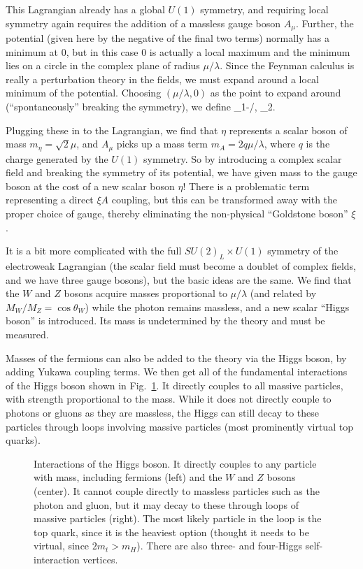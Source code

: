 This  Lagrangian already has a global $U(1)$ symmetry, and requiring local symmetry again requires the addition
of a massless gauge boson $A_\mu$.
Further, the potential (given here by the negative of the final two terms) normally has a minimum at 0, but in this case 0 is
actually a local maximum and the minimum lies on a circle in the complex plane of radius $\mu/\lambda$.
Since the Feynman calculus is really a perturbation theory in the fields, we must expand around a local minimum of the
potential. Choosing $(\mu/\lambda,0)$ as the point to expand around (``spontaneously'' breaking the symmetry), we define
\be
\eta\equiv\phi_1-\mu/\lambda, \;\;\; \xi\equiv\phi_2.
\ee

Plugging these in to the Lagrangian, we find that $\eta$ represents a scalar boson of mass $m_\eta=\sqrt{2}\mu$,
and $A_\mu$ picks up a mass term $m_A=2q\mu/\lambda$, where $q$ is the charge generated by the $U(1)$
symmetry. So by introducing a complex scalar field and breaking the symmetry of its potential, we have given
mass to the gauge boson at the cost of a new scalar boson $\eta$! There is a problematic term representing
a direct $\xi A$ coupling, but this can be transformed away with the proper choice of gauge, thereby eliminating 
the non-physical ``Goldstone boson'' $\xi$.

It is a bit more complicated with the full $SU(2)_L\times U(1)$ symmetry of the electroweak Lagrangian (the scalar
field must become a doublet of complex fields, and we have three gauge bosons), but the basic ideas are the same.
We find that the $W$ and $Z$ bosons acquire masses proportional to $\mu/\lambda$ (and related by $M_W/M_Z=\cos\theta_W$)
while the photon remains massless, and a new scalar ``Higgs boson'' is introduced. Its mass is undetermined by the theory
and must be measured.

Masses of the fermions can also be added to the theory via the Higgs boson, by adding Yukawa coupling terms. We then get all of the fundamental
interactions of the Higgs boson shown in Fig.~\ref{fig:higgs_diagrams}. It directly couples to all massive particles,
with strength proportional to the mass. While it does not directly couple to photons or gluons as they are massless,
the Higgs can still decay to these particles through loops involving massive particles (most prominently
virtual top quarks).

\begin{figure}[t]
  \addtolength{\abovecaptionskip}{5mm}
  \centering
  \vskip5mm
  
  
  
    \caption{Interactions of the Higgs boson. It directly couples to any particle with mass,
      including fermions (left) and the $W$ and $Z$ bosons (center). It cannot couple directly
      to massless particles such as the photon and gluon, but it may decay to these through loops
      of massive particles (right). The most likely particle in the loop is the top quark, since
      it is the heaviest option (thought it needs to be virtual, since $2m_t > m_H$). There
      are also three- and four-Higgs self-interaction vertices.
            }
    \label{fig:higgs_diagrams}
\end{figure}

